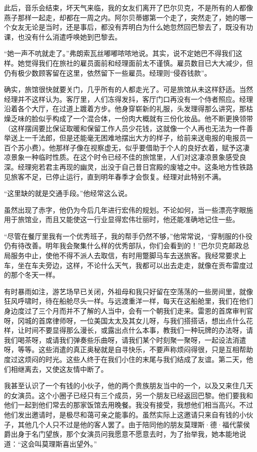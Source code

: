 \par 此后，音乐会结束，坏天气来临，我的女友们离开了巴尔贝克，不是所有的人都像燕子那样一起走，却都在一周之内。阿尔贝蒂娜第一个走了，突然走了，她的哪一个女友无论是当时，还是事后，都没有弄明白为什么她忽然回巴黎去了，既没有功课，也没有什么消遣呼唤她到巴黎去。
\par “她一声不吭就走了。”弗朗索瓦丝嘟嘟哝哝地说。其实，说不定她巴不得我们这样。她觉得我们在旅社的雇员面前和经理面前太不谨慎。雇员数目已大大减少，但仍有极少数顾客留在这里，依然留下一些雇员。经理则“侵吞钱款”。
\par 确实，旅馆很快就要关门，几乎所有的人都走光了。可是旅馆从未这样舒适。当然经理并不这样认为。客厅里，人们冻得发抖，客厅门口再没有一个侍者照应。经理沿着各个大厅，在过道上踱着方步。他身穿崭新的礼服，头发理得那么讲究，那枯燥乏味的脸似乎构成了一个混合体，一份肉大概就有三份化妆品。他不断更换领带（这样摆阔要比保证取暖和保留工作人员少花钱，这就像一个人再也无法为一件善举送上一千法郎，但是还能毫无困难地摆出大方的样子，给前来送电报的电报员一百个苏小费）。他那样子像在视察虚无，似乎要借助于个人的良好衣着，赋予这凄凉景象一种临时性质。在这个时令已经不佳的旅馆里，人们对这凄凉景象感受良深。经理宛若君主再现的幽灵，出没于自己昔日宫殿的废墟之中。这条地方性铁路见旅客不足，已停止运行，直到明年春季才会恢复。经理对此特别不满。
\par “这里缺的就是交通手段。”他经常这么说。
\par 虽然出现了赤字，他仍为今后几年进行宏伟的规划。不论如何，当一些漂亮字眼施用于旅馆业，而且又能使这一行业显得宏伟壮丽时，他还能准确地记住一些。
\par “尽管在餐厅里我有一个优秀班子，我的帮手仍然不够，”他常常说，“穿制服的仆役仍有待改善。明年我会聚集什么样的优秀部队，你们会看到的！”巴尔贝克邮政总局服务中止，使他不得不派人去取信，有时用蹩脚马车去送旅客。我经常要求上车，坐在车夫旁边，这样，不论什么天气，我都可以出去走走，就像在贡布雷度过的那个冬天一样。
\par 有时暴雨如注，游艺场早已关闭，外祖母和我只好留在空荡荡的一些房间里，就像狂风呼啸时，待在船舱尽头一样。与远渡重洋一样，每天在这船舱里，我们在他们身边度过了三个月而并不了解的人当中，会有一个朝我们走来。雷恩的首席审判官呀，冈城的首席律师呀，一位美国太太及其女儿呀，与我们搭搭话，想出点什么花样，让时间不要显得那么漫长，或露出点什么本事，教我们一种玩牌的办法呀，请我们喝茶呀，或请我们弹奏些乐曲呀，请我们某个时刻聚一聚呀，一起设法消遣呀，等等。这些消遣的真正奥秘就是自寻快乐，不要声称烦闷得很，只是互相帮助度过这烦闷的时光。这些人终于在我们小住的末尾与我们结成了友谊。第二天，他们相继离去，又使这友情中断了。
\par 我甚至认识了一个有钱的小伙子，他的两个贵族朋友当中的一个，以及又来住几天的女演员。这个小圈子已经只有三个成员，另一个朋友已经返回巴黎。他们要我和他们一起到他们常去的那家饭馆去用晚餐。我没有接受，我想他们相当高兴。不过他们发出邀请时，是极尽和蔼可亲之能事的。虽然实际上这邀请只来自有钱的小伙子，其他几个人只不过是他的客人罢了。由于陪同他的朋友莫理斯·德·福代蒙侯爵出身于名门望族，那个女演员问我愿意不愿意去时，为了抬举我，她本能地说道：“这会叫莫理斯喜出望外。”

